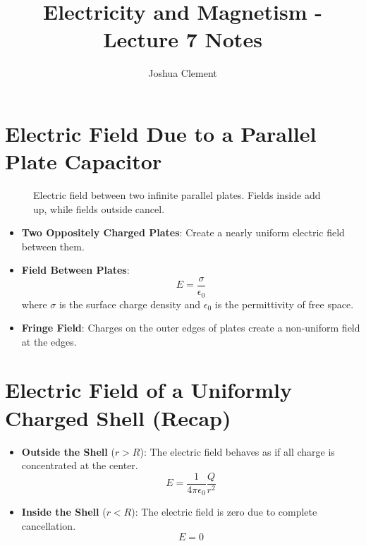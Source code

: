 \documentclass{article}
\begin{document}
\title{Electricity and Magnetism - Lecture 7 Notes}
\author{Joshua Clement}
\maketitle

\section*{Electric Field Due to a Parallel Plate Capacitor}

\begin{figure}[h!]
    \centering
    \caption{Electric field between two infinite parallel plates. Fields inside add up, while fields outside cancel.}
    \label{fig:parallel_plates_field}
\end{figure}

\begin{itemize}
    \item \textbf{Two Oppositely Charged Plates}: Create a nearly uniform electric field between them.
    \item \textbf{Field Between Plates}:
    \[
    E = \frac{\sigma}{\epsilon_0}
    \]
    where \(\sigma\) is the surface charge density and \(\epsilon_0\) is the permittivity of free space.
    \item \textbf{Fringe Field}: Charges on the outer edges of plates create a non-uniform field at the edges.
\end{itemize}

\section*{Electric Field of a Uniformly Charged Shell (Recap)}
\begin{itemize}
    \item \textbf{Outside the Shell} (\(r > R\)): The electric field behaves as if all charge is concentrated at the center.
    \[
    E = \frac{1}{4\pi\epsilon_0} \frac{Q}{r^2}
    \]
    \item \textbf{Inside the Shell} (\(r < R\)): The electric field is zero due to complete cancellation.
    \[
    E = 0
    \]
\end{itemize}
\end{document}
